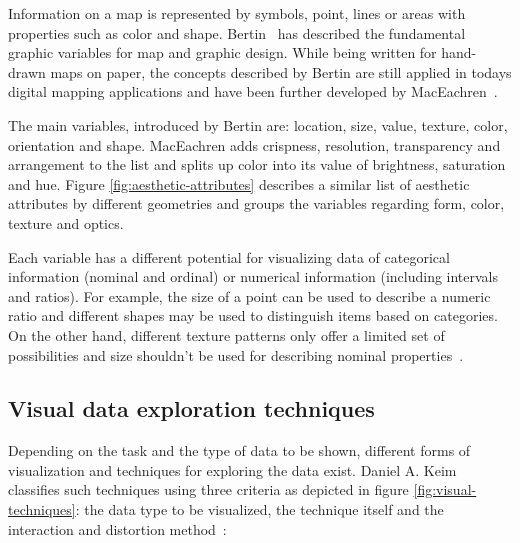 Information on a map is represented by symbols, point, lines or areas with properties such as color and shape. Bertin~\cite{bertin67graphics, bertin83graphics} has described the fundamental graphic variables for map and graphic design. While being written for hand-drawn maps on paper, the concepts described by Bertin are still applied in todays digital mapping applications and have been further developed by MacEachren~\cite{MacEachren95maps}.

The main variables, introduced by Bertin are: location, size, value, texture, color, orientation and shape. MacEachren adds crispness, resolution, transparency and arrangement to the list and splits up color into its value of brightness, saturation and hue. Figure \ref{fig:aesthetic-attributes} describes a similar list of aesthetic attributes by different geometries and groups the variables regarding form, color, texture and optics.

Each variable has a different potential for visualizing data of categorical information (nominal and ordinal) or numerical information (including intervals and ratios). For example, the size of a point can be used to describe a numeric ratio and different shapes may be used to distinguish items based on categories. On the other hand, different texture patterns only offer a limited set of possibilities and size shouldn't be used for describing nominal properties~\cite{noellenburg11geovis, MacEachren95maps}. 

\subsection{Visual data exploration techniques}
\label{vis-data-techniques}

Depending on the task and the type of data to be shown, different forms of visualization and techniques for exploring the data exist. Daniel A. Keim~\cite{keim2001vis} classifies such techniques using three criteria as depicted in figure \ref{fig:visual-techniques}: the data type to be visualized, the technique itself and the interaction and distortion method~\cite{Delort10vis}:

